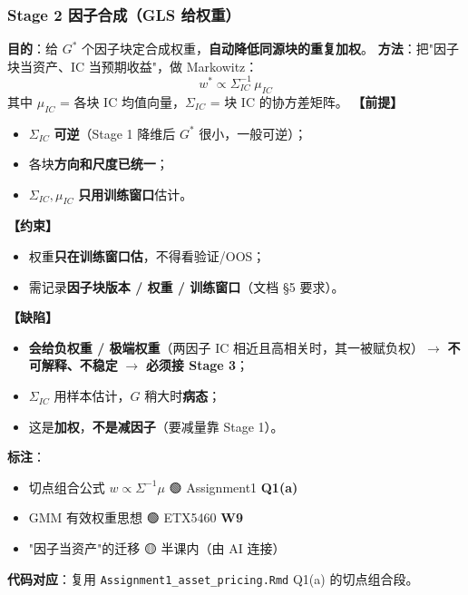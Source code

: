 \documentclass[11pt]{article}
\begin{document}
\subsubsection{\texorpdfstring{Stage 2 \textperiodcentered{} 因子合成（GLS 给权重）}{Stage 2 · 因子合成（GLS 给权重）}}
\textbf{目的}：给 $G^{*}$ 个因子块定合成权重，\textbf{自动降低同源块的重复加权}。
\textbf{方法}：把"因子块当资产、IC 当预期收益"，做 Markowitz：
\[
w^{*} \propto \Sigma_{IC}^{-1}\,\mu_{IC}
\]
其中 $\mu_{IC}$ = 各块 IC 均值向量，$\Sigma_{IC}$ = 块 IC 的协方差矩阵。
\textbf{【前提】}
\begin{itemize}
  \item $\Sigma_{IC}$ \textbf{可逆}（Stage 1 降维后 $G^{*}$ 很小，一般可逆）；
  \item 各块\textbf{方向和尺度已统一}；
  \item $\Sigma_{IC},\mu_{IC}$ \textbf{只用训练窗口}估计。
\end{itemize}
\textbf{【约束】}
\begin{itemize}
  \item 权重\textbf{只在训练窗口估}，不得看验证/OOS；
  \item 需记录\textbf{因子块版本 / 权重 / 训练窗口}（文档 \S5 要求）。
\end{itemize}
\textbf{【缺陷】}
\begin{itemize}
  \item \textbf{会给负权重 / 极端权重}（两因子 IC 相近且高相关时，其一被赋负权）\ensuremath{\rightarrow} \textbf{不可解释、不稳定} \ensuremath{\rightarrow} \textbf{必须接 Stage 3}；
  \item $\Sigma_{IC}$ 用样本估计，$G$ 稍大时\textbf{病态}；
  \item 这是\textbf{加权}，\textbf{不是减因子}（要减量靠 Stage 1）。
\end{itemize}
\textbf{标注}：
\begin{itemize}
  \item 切点组合公式 $w\propto\Sigma^{-1}\mu$ 🟢 Assignment1 \textbf{Q1(a)}
  \item GMM 有效权重思想 🟢 ETX5460 \textbf{W9}
  \item "因子当资产"的迁移 🟡 半课内（由 AI 连接）
\end{itemize}
\textbf{代码对应}：复用 \texttt{Assignment1\_asset\_pricing.Rmd} Q1(a) 的切点组合段。
\end{document}
